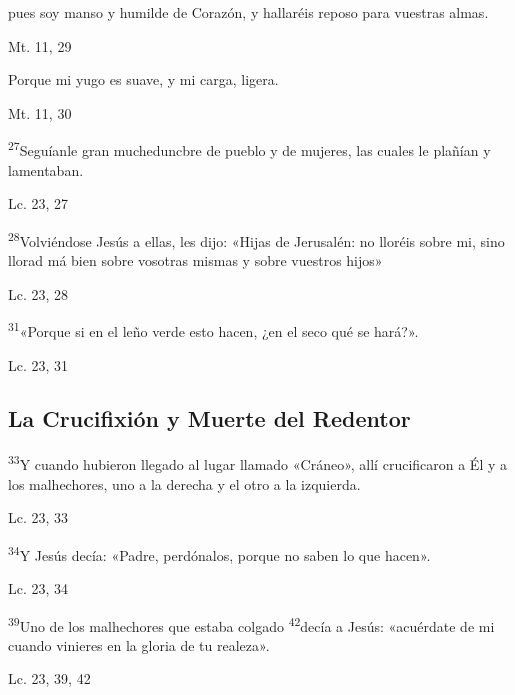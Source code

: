 \documentclass[a4paper,11pt]{article}
\begin{document}
      pues soy manso y humilde de Corazón, y hallaréis reposo para vuestras almas.
      \begin{flushright}
        Mt. 11, 29
      \end{flushright}

      Porque mi yugo es suave, y mi carga, ligera.
      \begin{flushright}
        Mt. 11, 30
      \end{flushright}

      \textsuperscript{27}Seguíanle gran mucheduncbre de pueblo y de mujeres, las cuales le plañían y lamentaban.
      \begin{flushright}
        Lc. 23, 27
      \end{flushright}

      \textsuperscript{28}Volviéndose Jesús a ellas, les dijo: «Hijas de Jerusalén: no lloréis sobre mi, sino llorad má bien sobre vosotras mismas y sobre
      vuestros hijos»
      \begin{flushright}
        Lc. 23, 28
      \end{flushright}

      \textsuperscript{31}«Porque si en el leño verde esto hacen, ¿en el seco qué se hará?».
      \begin{flushright}
        Lc. 23, 31
      \end{flushright}

    \subsection*{\hfil La Crucifixión y Muerte del Redentor \hfil}
      
      \textsuperscript{33}Y cuando hubieron llegado al lugar llamado «Cráneo», allí crucificaron a Él y a los malhechores, uno a la derecha y el otro a la izquierda.
      \begin{flushright}
        Lc. 23, 33
      \end{flushright}

      \textsuperscript{34}Y Jesús decía: «Padre, perdónalos, porque no saben lo que hacen».
      \begin{flushright}
        Lc. 23, 34
      \end{flushright}

      \textsuperscript{39}Uno de los malhechores que estaba colgado \textsuperscript{42}decía a Jesús: «acuérdate de mi cuando vinieres en la gloria de tu realeza».
      \begin{flushright}
        Lc. 23, 39, 42
      \end{flushright}
\end{document}
